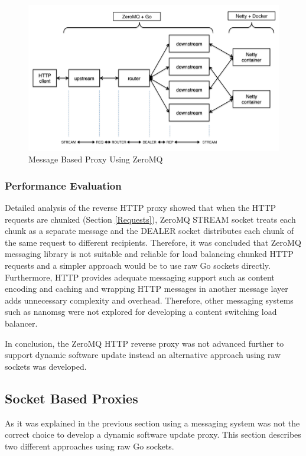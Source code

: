 \documentclass[a4paper,11pt,twoside]{article}
\begin{document}
\begin{figure}[!ht]
  \centering
     \includegraphics[scale=0.31]{prototype}
  \caption{Message Based Proxy Using ZeroMQ}
  \label{prototype}
\end{figure}

\subsubsection{Performance Evaluation}
Detailed analysis of the reverse HTTP proxy showed that when the HTTP requests are chunked (Section \ref{Requests}), ZeroMQ STREAM socket treats each chunk as a separate message and the DEALER socket distributes each chunk of the same request to different recipients. Therefore, it was concluded that ZeroMQ messaging library is not suitable and reliable for load balancing chunked HTTP requests and a simpler approach would be to use raw Go sockets directly. Furthermore, HTTP provides adequate messaging support such as content encoding and caching and wrapping HTTP messages in another message layer adds unnecessary complexity and overhead. Therefore, other messaging systems such as nanomsg were not explored for developing a content switching load balancer. 

In conclusion, the ZeroMQ HTTP reverse proxy was not advanced further to support dynamic software update instead an alternative approach using raw sockets was developed. 

\subsection{Socket Based Proxies}
As it was explained in the previous section using a messaging system was not the correct choice to develop a dynamic software update proxy. This section describes two different approaches using raw Go sockets.   
\end{document}
